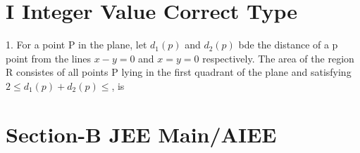 \documentclass[12pt]{article}
\begin{document}
\section*{I\hspace{1cm} Integer Value Correct Type }

1. For a point P in the plane, let $d_1(p)$ and $d_2(p)$ bde the distance of a p point   
from the lines $x-y=0$ and $x=y=0$ respectively. The area of the region R consistes of all points P lying in the first quadrant of the plane and satisfying $2\leq d_1(p)+d_2(p)\leq$, is\\

\section*{Section-B \hspace{1cm}   JEE Main/AIEE}
\end{document}
